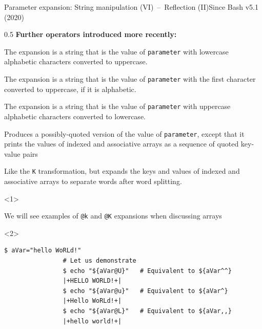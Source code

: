\begin{frame}[fragile]{Parameter expansion: String manipulation (VI)~--~Reflection (II)}{Since Bash v5.1 (2020)}
    \begin{overlayarea}{\textwidth}{0.5\textheight}
        \textbf{Further operators introduced more recently:}
        \begin{description}[X:]
            \item[U]
            {\small
                The expansion is a string that is the value of \texttt{parameter} with lowercase alphabetic characters converted to uppercase.
            }
            \item[u]
            {\small
                The expansion is a string that is the value of \texttt{parameter} with the first character converted to uppercase, if it is alphabetic.
            }
            \item[L]
            {\small
                The expansion is a string that is the value of \texttt{parameter} with uppercase alphabetic characters converted to lowercase.
            }
            \item<only@1>[K]
            {\small
                Produces a possibly-quoted version of the value of \texttt{parameter}, except that it prints the values of indexed and associative arrays as a sequence of quoted key-value pairs
            }
            \item<only@1>[k]
            {\small
                Like the \texttt{K} transformation, but expands the keys and values of indexed and associative arrays to separate words after word splitting. 
            }
        \end{description}
        \begin{onlyenv}<1>
            \begin{center}
                \alert{We will see examples of \texttt{@k} and \texttt{@K} expansions when discussing arrays}
            \end{center}
        \end{onlyenv}
        \begin{onlyenv}<2>
            \begin{lstlisting}[style=MyBash, style=oddnumbers, aboveskip=3mm]
                $ aVar="hello WoRLd!"
                # Let us demonstrate
                $ echo "${aVar@U}"   # Equivalent to ${aVar^^}
                |+HELLO WORLD!+|
                $ echo "${aVar@u}"   # Equivalent to ${aVar^}
                |+Hello WoRLd!+|
                $ echo "${aVar@L}"   # Equivalent to ${aVar,,}
                |+hello world!+|
            \end{lstlisting}
        \end{onlyenv}
    \end{overlayarea}
\end{frame}
